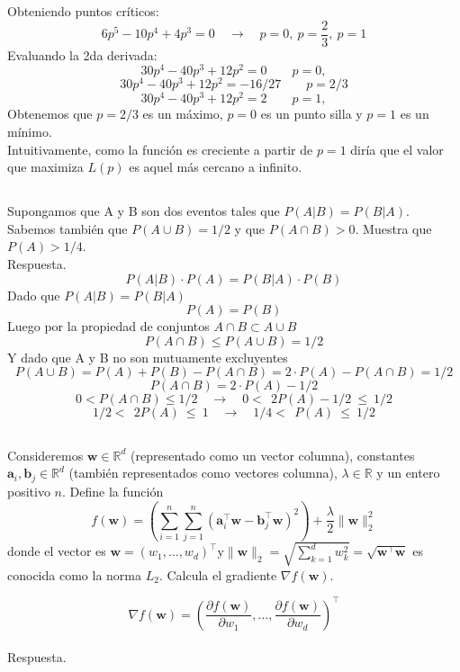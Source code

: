 \documentclass{article}
\begin{document}
Obteniendo puntos críticos:
\[6p^5-10p^4+4p^3 = 0 \quad \rightarrow \quad p=0, \: p = \dfrac{2}{3}, \: p=1 \]
Evaluando la 2da derivada:
\[30p^4-40p^3+12p^2 = 0 \quad \quad p=0,\]
\[30p^4-40p^3+12p^2 = -16/27 \quad \quad p=2/3\]
\[30p^4-40p^3+12p^2 = 2 \quad \quad p=1,\]
Obtenemos que $p=2/3$ es un máximo, $p=0$ es un punto silla y $p=1$ es un mínimo.\\

Intuitivamente, como la función es creciente a partir de $p=1$ diría que el valor que maximiza $L(p)$ es aquel más cercano a infinito.


\subsection{}
Supongamos que A y B son dos eventos tales que $P(A|B) = P(B|A)$. Sabemos también que $P(A \cup B) = 1/2$ y que $P(A \cap B) > 0$. Muestra que $P(A) > 1/4$.\\

Respuesta.
\[P(A|B)\cdot P(A) = P(B|A)\cdot P(B)\]
Dado que $P(A|B) = P(B|A)$
\[ P(A) = P(B)\]
Luego por la propiedad de conjuntos $A\cap B \subset A\cup B$
\[P(A\cap B) \leq P(A\cup B)=1/2\]
Y dado que A y B no son mutuamente excluyentes
\[P(A\cup B)=P(A)+P(B)-P(A\cap B)=2\cdot P(A)-P(A\cap B)=1/2\]
\[P(A\cap B)=2\cdot P(A)-1/2\]
\[0 < P(A\cap B) \leq 1/2 \quad \rightarrow \quad 0 <\:\: 2 P(A)-1/2 \:\leq \:1/2 \]
\[1/2 <\:\: 2 P(A) \:\leq \:1 \quad \rightarrow \quad 1/4 <\:\: P(A) \:\leq \:1/2 \]


\subsection{}
Consideremos $\boldsymbol{w} \in \mathbb{R}^d$ (representado como un vector columna), constantes $\boldsymbol{a}_i, \boldsymbol{b}_j \in \mathbb{R}^d$ (también representados como vectores columna), $\lambda \in \mathbb{R}$ y un entero positivo $n$. Define la función
$$
f(\boldsymbol{w})=\left(\sum_{i=1}^n \sum_{j=1}^n\left(\boldsymbol{a}_i^{\top} \boldsymbol{w}-\boldsymbol{b}_j^{\top} \boldsymbol{w}\right)^2\right)+\frac{\lambda}{2}\|\boldsymbol{w}\|_2^2
$$
donde el vector es $\boldsymbol{w}=\left(w_1, \ldots, w_d\right)^{\top} \mathrm{y}\|\boldsymbol{w}\|_2=\sqrt{\sum_{k=1}^d w_k^2}=\sqrt{\boldsymbol{w}^{\top} \boldsymbol{w}}$ es conocida como la norma $L_2$. Calcula el gradiente $\nabla f(\boldsymbol{w})$.

$$
\nabla f(\boldsymbol{w})=\left(\frac{\partial f(\boldsymbol{w})}{\partial w_1}, \ldots, \frac{\partial f(\boldsymbol{w})}{\partial w_d}\right)^{\top}
$$
\\
Respuesta.
\end{document}
